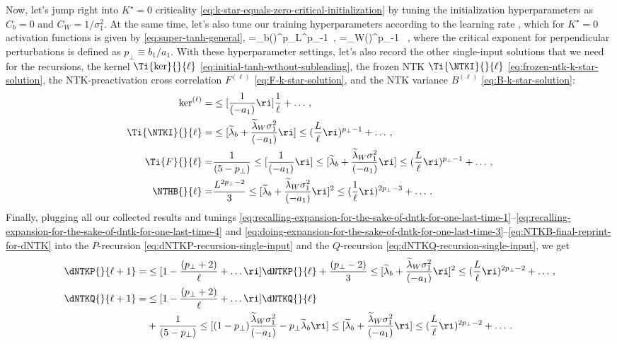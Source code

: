 Now, let's jump right into $K^\star=0$ criticality  \eqref{eq:k-star-equals-zero-critical-initialization} by tuning the initialization hyperparameters as $C_b=0$ and $C_W =1/\sigma_1^2$. At the same time, let's also tune our training hyperparameters according to the learning rate , which for $K^\star=0$ activation functions is given by \eqref{eq:super-tanh-general},
\be
\Lb{\ell}=\widetilde{\lambda}_b\le(\ri)^{p_{\perp}}L^{p_{\perp}-1}\, , \qquad \lamW{\ell}=\widetilde{\lambda}_W\le(\ri)^{p_{\perp}-1} \, ,
\ee
where the critical exponent for perpendicular perturbations is defined as $p_{\perp}\equiv b_1/a_1$. With these hyperparameter settings, let's also record the other single-input solutions that we need for the recursions, the kernel $\Ti{\ker}{}{\ell}$ \eqref{eq:initial-tanh-wthout-subleading},  the frozen NTK $\Ti{\NTKI}{}{\ell}$ \eqref{eq:frozen-ntk-k-star-solution}, the NTK-preactivation cross correlation $F^{(\ell)}$ \eqref{eq:F-k-star-solution}, and the NTK variance $B^{(\ell)}$ \eqref{eq:B-k-star-solution}:
\begin{align}
\ker^{(\ell)}=&\le[\frac{1}{(-a_1)}\ri]\frac{1}{\ell}+ \ldots\, ,\label{eq:oh-really-we-have-to-recall-this-again-dots-yes}\\
\label{eq:K-star-frozen-NTK-dNTK-reprint}
\Ti{\NTKI}{}{\ell}=&\le[\widetilde{\lambda}_b+\frac{\widetilde{\lambda}_W\sigma_1^2}{(-a_1)}\ri]\le( \frac{L}{\ell}\ri)^{p_{\perp}-1}+\ldots\, , \\
\Ti{F}{}{\ell}=&\frac{1}{(5-p_{\perp})}\le[\frac{1}{(-a_1)}\ri] \le[\widetilde{\lambda}_b+\frac{\widetilde{\lambda}_W\sigma_1^2}{(-a_1)}\ri]\le(\frac{L}{\ell}\ri)^{p_{\perp}-1}+\ldots\, , \\
\NTHB{}{\ell}=&\frac{L^{2p_{\perp}-2}}{3} \le[\widetilde{\lambda}_b+\frac{\widetilde{\lambda}_W\sigma_1^2}{(-a_1)}\ri]^2\le(\frac{1}{\ell}\ri)^{2p_{\perp}-3}+\ldots\, .
\label{eq:NTKB-final-reprint-for-dNTK}
\end{align}
Finally, plugging all our collected results and tunings \eqref{eq:recalling-expansion-for-the-sake-of-dntk-for-one-last-time-1}--\eqref{eq:recalling-expansion-for-the-sake-of-dntk-for-one-last-time-4} and \eqref{eq:doing-expansion-for-the-sake-of-dntk-for-one-last-time-3}--\eqref{eq:NTKB-final-reprint-for-dNTK}  into the $P$-recursion \eqref{eq:dNTKP-recursion-single-input} and the $Q$-recursion \eqref{eq:dNTKQ-recursion-single-input}, we get
\begin{align}\label{eq:P-recursion-K-star}
\dNTKP{}{\ell+1}=&\le[1-\frac{(p_{\perp}+2)}{\ell}+\ldots\ri]\dNTKP{}{\ell}
+\frac{(p_\perp -2) }{3}\le[\widetilde{\lambda}_b+\frac{\widetilde{\lambda}_W\sigma_1^2}{(-a_1)}\ri]^2\le( \frac{L}{\ell}\ri)^{2p_{\perp}-2}
+ \dots \, ,\\
\dNTKQ{}{\ell+1}=&\le[1-\frac{(p_{\perp}+2)}{\ell}+\ldots\ri]\dNTKQ{}{\ell}\, \label{eq:Q-recursion-K-star}\\
&+\frac{1}{(5-p_\perp)}\le[ (1-p_{\perp})\frac{\widetilde{\lambda}_W \sigma_1^2}{(-a_1)}  -p_{\perp}\widetilde{\lambda}_b\ri]\le[\widetilde{\lambda}_b+\frac{\widetilde{\lambda}_W\sigma_1^2}{(-a_1)}\ri]\le( \frac{L}{\ell}\ri)^{2p_{\perp}-2}+\ldots\, .\notag
\end{align}



